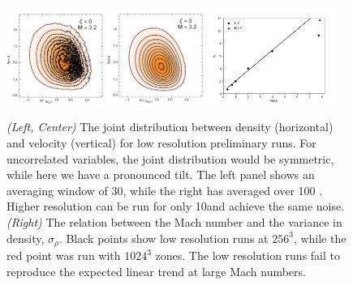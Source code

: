 \begin{figure} \begin{center}
\includegraphics[width=0.28\textwidth]{Joint1e.png}
\includegraphics[width=0.28\textwidth]{Joint2e.png}
\includegraphics[width=0.38\textwidth]{resolution.png}
\caption[ ]{\emph{(Left, Center)} The joint distribution between density (horizontal) and velocity (vertical) for low resolution preliminary runs.  For uncorrelated variables, the joint distribution would be symmetric, while here we have a pronounced tilt.  The left panel shows an averaging window of 30\tdyn, while the right has averaged over 100 \tdyn. Higher resolution can be run for only 10\tdyn and achieve the same noise.
\emph{(Right)}
The relation between  the Mach number and the
variance in density, $\sigma_\rho$.  Black points show low resolution runs at
$256^3$, while the red point was run with $1024^3$ zones.  The low resolution
runs fail to reproduce the expected linear trend at large Mach numbers.  
}
\label{fig.joint} \end{center} \end{figure}

